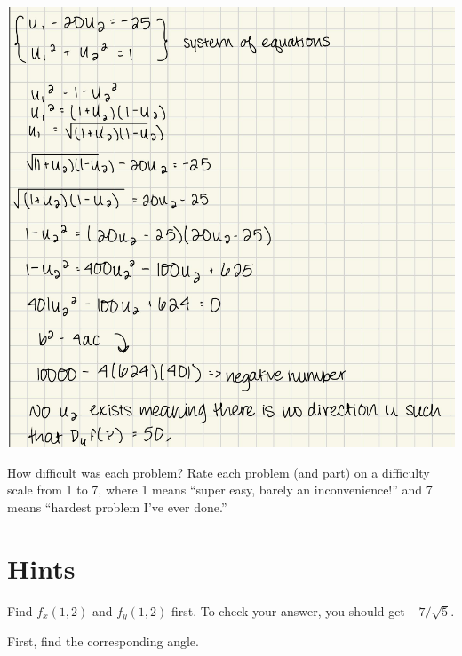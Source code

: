 \begin{solution}
  \includegraphics[width=\textwidth]{nice/p5.5_eesha.png}
\end{solution}

\begin{problem}
  How difficult was each problem? Rate each problem (and part) on a difficulty scale from 1 to 7, where 1 means ``super easy, barely an inconvenience!'' and 7 means ``hardest problem I've ever done.''
\end{problem}

\newpage

\section{Hints}
\begin{hint}
  Find $f_x(1,2)$ and $f_y(1,2)$ first. To check your answer, you should get $-7/\sqrt5$.
\end{hint}

\begin{hint}
  First, find the corresponding angle.
\end{hint}
